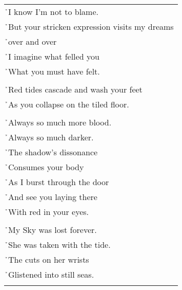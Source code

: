 \documentclass{article}
\begin{document}
\begin{center}
\begin{tabular}{l}
\h{}I know I'm not to blame. \\
\h{}But your stricken expression visits my dreams \\
\h{}over and over \\
\h{}I imagine what felled you \\
\h{}What you must have felt. \\
\\
\h{}Red tides cascade and wash your feet \\
\h{}As you collapse on the tiled floor. \\
\\
\h{}Always so much more blood. \\
\h{}Always so much darker. \\
\h{}The shadow's dissonance \\
\h{}Consumes your body \\
\h{}As I burst through the door \\
\h{}And see you laying there \\
\h{}With red in your eyes. \\
\\
\h{}My Sky was lost forever. \\
\h{}She was taken with the tide. \\
\h{}The cuts on her wrists \\
\h{}Glistened into still seas. \\ %
\\
\end{tabular}
\end{center}
\end{document}
